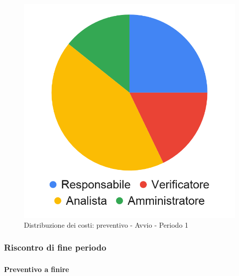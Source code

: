 \hspace{-1cm}
\begin{minipage}{0.60\textwidth}
	\smallPreventivoTable{	
}
\end{minipage}
\begin{minipage}{.40\textwidth}
\begin{figure}[H]
	\includegraphics[scale=0.21]{res/images/charts/preventivo_priori/Grafico4-0.png}
	\caption{Distribuzione dei costi: preventivo - Avvio - Periodo 1}
\end{figure}
\end{minipage} 


\subsubsection{Riscontro di fine periodo}


\subparagraph*{}


\paragraph{Preventivo a finire}
\subparagraph*{}

\pafTable{
	
}

